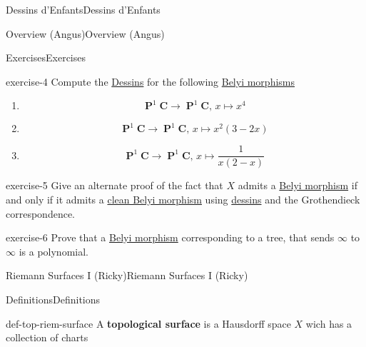 \documentclass[10pt,]{book}
\newcommand{\terminology}[1]{\textbf{#1}}
\numberwithin{equation}{section}
\newcommand{\CC}{\mathbf{C}}
\DeclareMathOperator{\PP}{\mathbf{P}}
\begin{document}
\begin{chapterptx}{Dessins d'Enfants}{}{Dessins d'Enfants}{}{}
\begin{sectionptx}{Overview (Angus)}{}{Overview (Angus)}{}{}
\begin{subsectionptx}{Exercises}{}{Exercises}{}{}
\begin{inlineexercise}{}{exercise-4}
Compute the \hyperref[def-dessin-denfant]{Dessins} for the following \hyperref[def-belyi-morphism]{Belyi morphisms}\leavevmode%
\begin{enumerate}
\item\hypertarget{li-98}{}%
\begin{equation*}
\PP^1\CC\to \PP^1\CC,\,x\mapsto x^4
\end{equation*}
%
\item\hypertarget{li-99}{}%
\begin{equation*}
\PP^1\CC\to \PP^1\CC,\,x\mapsto x^2(3-2x)
\end{equation*}
%
\item\hypertarget{li-100}{}%
\begin{equation*}
\PP^1\CC\to \PP^1\CC,\,x\mapsto \frac{1}{x(2-x)}
\end{equation*}
%
\end{enumerate}
%
\end{inlineexercise}
\begin{inlineexercise}{}{exercise-5}%
\hypertarget{p-479}{}%
Give an alternate proof of the fact that \(X\) admits a \hyperref[def-belyi-morphism]{Belyi morphism} if and only if it admits a \hyperref[def-belyi-morphism]{clean Belyi morphism} using \hyperref[def-dessin-denfant]{dessins} and the Grothendieck correspondence.%
\end{inlineexercise}
\begin{inlineexercise}{}{exercise-6}%
\hypertarget{p-480}{}%
Prove that a \hyperref[def-belyi-morphism]{Belyi morphism} corresponding to a tree, that sends \(\infty\) to \(\infty\) is a polynomial.%
\end{inlineexercise}
\end{subsectionptx}
\end{sectionptx}
%
%
\typeout{************************************************}
\typeout{************************************************}
%
\begin{sectionptx}{Riemann Surfaces I (Ricky)}{}{Riemann Surfaces I (Ricky)}{}{}\label{sec-dessins-riemann-surfaces}
%
%
\typeout{************************************************}
\typeout{************************************************}
%
\begin{subsectionptx}{Definitions}{}{Definitions}{}{}\label{subsection-44}
\begin{definition}{}{def-top-riem-surface}%
\hypertarget{p-481}{}%
A \terminology{topological surface} is a Hausdorff space \(X\) wich has a collection of charts%

\end{definition}
\end{subsectionptx}
\end{sectionptx}
\end{chapterptx}
\end{document}
